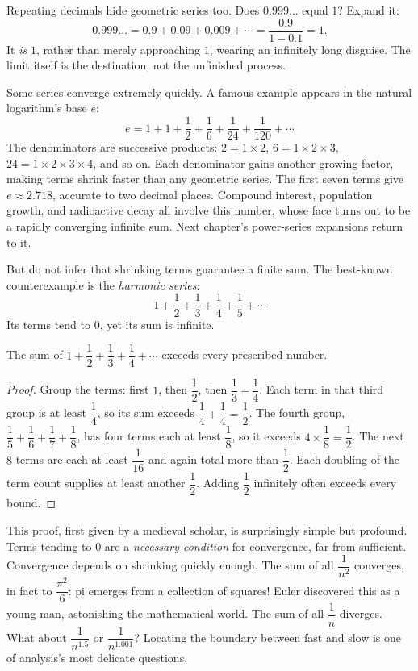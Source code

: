 Repeating decimals hide geometric series too. Does $0.999\ldots$ equal $1$? Expand it:
\[
0.999\ldots=0.9+0.09+0.009+\cdots=\frac{0.9}{1-0.1}=1 .
\]
It \emph{is} $1$, rather than merely approaching $1$, wearing an infinitely long disguise. The limit itself is the destination, not the unfinished process.

Some series converge extremely quickly. A famous example appears in the natural logarithm's base $e$:
\[
e=1+1+\frac12+\frac16+\frac1{24}+\frac1{120}+\cdots
\]
The denominators are successive products: $2=1\times2$, $6=1\times2\times3$, $24=1\times2\times3\times4$, and so on. Each denominator gains another growing factor, making terms shrink faster than any geometric series. The first seven terms give $e\approx2.718$, accurate to two decimal places. Compound interest, population growth, and radioactive decay all involve this number, whose face turns out to be a rapidly converging infinite sum. Next chapter's power-series expansions return to it.

But do not infer that shrinking terms guarantee a finite sum. The best-known counterexample is the \emph{harmonic series}:
\[
1+\frac12+\frac13+\frac14+\frac15+\cdots
\]
Its terms tend to $0$, yet its sum is infinite.

\begin{dingli}
The sum of $1+\dfrac12+\dfrac13+\dfrac14+\cdots$ exceeds every prescribed number.
\end{dingli}

\begin{proof}
Group the terms: first $1$, then $\dfrac12$, then $\dfrac13+\dfrac14$. Each term in that third group is at least $\dfrac14$, so its sum exceeds $\dfrac14+\dfrac14=\dfrac12$. The fourth group, $\dfrac15+\dfrac16+\dfrac17+\dfrac18$, has four terms each at least $\dfrac18$, so it exceeds $4\times\dfrac18=\dfrac12$. The next $8$ terms are each at least $\dfrac1{16}$ and again total more than $\dfrac12$. Each doubling of the term count supplies at least another $\dfrac12$. Adding $\dfrac12$ infinitely often exceeds every bound.
\end{proof}

This proof, first given by a medieval scholar, is surprisingly simple but profound. Terms tending to $0$ are a \emph{necessary condition} for convergence, far from sufficient. Convergence depends on shrinking quickly enough. The sum of all $\dfrac1{n^{2}}$ converges, in fact to $\dfrac{\pi^{2}}{6}$: pi emerges from a collection of squares! Euler discovered this as a young man, astonishing the mathematical world. The sum of all $\dfrac1n$ diverges. What about $\dfrac1{n^{1.5}}$ or $\dfrac1{n^{1.001}}$? Locating the boundary between fast and slow is one of analysis's most delicate questions.

